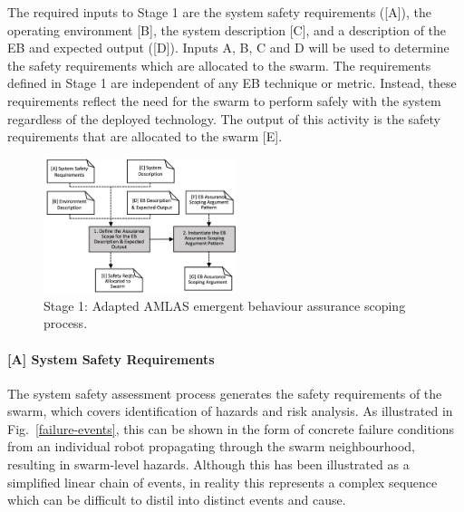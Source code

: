 \documentclass[lettersize,journal]{IEEEtran}
\begin{document}
The required inputs to Stage 1 are the system safety requirements ([A]), the operating environment [B], the system description [C], and a description of the EB and expected output ([D]). 
Inputs A, B, C and D will be used to determine the safety requirements which are allocated to the swarm. 
The requirements defined in Stage 1 are independent of any EB technique or metric.
Instead, these requirements reflect the need for the swarm to perform safely with the system regardless of the deployed technology. 
The output of this activity is the safety requirements that are allocated to the swarm [E]. 
\begin{figure}[!t]
	\centering
	\includegraphics[width=0.5\textwidth]{figures/amlas-a-stage1-v2.png}
	\caption{Stage 1: Adapted AMLAS emergent behaviour assurance scoping process.}
	\label{amlas-a-stage1}
\end{figure}
\paragraph*{[A] System Safety Requirements}
The system safety assessment process generates the safety requirements of the swarm, which covers identification of hazards and risk analysis. 
As illustrated in Fig.~\ref{failure-events}, this can be shown in the form of concrete failure conditions from an individual robot propagating through the swarm neighbourhood, resulting in swarm-level hazards. 
Although this has been illustrated as a simplified linear chain of events, in reality this represents a complex sequence which can be difficult to distil into distinct events and cause.
\end{document}
